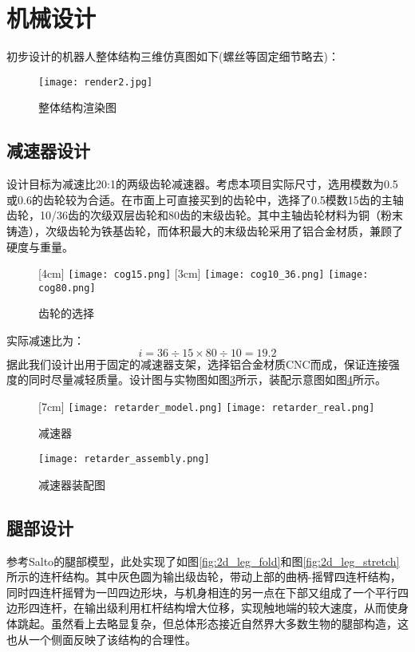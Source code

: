 \section{机械设计}
\label{sec:mechanical}
初步设计的机器人整体结构三维仿真图如下(螺丝等固定细节略去)：
\begin{figure}[H]
  \centering
  \texttt{[image: render2.jpg]}
  \caption{整体结构渲染图}
  \label{fig:render_v1}
\end{figure}
\subsection{减速器设计}
设计目标为减速比20:1的两级齿轮减速器。考虑本项目实际尺寸，选用模数为0.5或0.6的齿轮较为合适。在市面上可直接买到的齿轮中，选择了0.5模数15齿的主轴齿轮，10/36齿的次级双层齿轮和80齿的末级齿轮。其中主轴齿轮材料为铜（粉末铸造），次级齿轮为铁基齿轮，而体积最大的末级齿轮采用了铝合金材质，兼顾了硬度与重量。

\begin{figure}[H]
  \centering
  [4cm] 
    {\texttt{[image: cog15.png]}}
  \hspace{3em}
  [3cm]
      {\texttt{[image: cog10\_36.png]}}
  \hspace{4em}
      {\texttt{[image: cog80.png]}}
  \caption{齿轮的选择}
  \label{fig:cogs}

\end{figure}
实际减速比为：$$i=36\div15\times80\div10=19.2$$
据此我们设计出用于固定的减速器支架，选择铝合金材质CNC而成，保证连接强度的同时尽量减轻质量。设计图与实物图如图\ref{fig:retarder}所示，装配示意图如图\ref{fig:retarder_assembly}所示。
\begin{figure}[H]
  \centering
  [7cm] 
    {\texttt{[image: retarder\_model.png]}}
  \hspace{4em}
      {\texttt{[image: retarder\_real.png]}}
  \caption{减速器}
  \label{fig:retarder}
\end{figure}
\begin{figure}[H]
  \centering%
  \texttt{[image: retarder\_assembly.png]}
  \caption{减速器装配图}
  \label{fig:retarder_assembly}
\end{figure}
\subsection{腿部设计}
参考Salto\cite{Salto}的腿部模型，此处实现了如图\ref{fig:2d_leg_fold}和图\ref{fig:2d_leg_stretch}所示的连杆结构。其中灰色圆为输出级齿轮，带动上部的曲柄-摇臂四连杆结构，同时四连杆摇臂为一凹四边形块，与机身相连的另一点在下部又组成了一个平行四边形四连杆，在输出级利用杠杆结构增大位移，实现触地端的较大速度，从而使身体跳起。虽然看上去略显复杂，但总体形态接近自然界大多数生物的腿部构造，这也从一个侧面反映了该结构的合理性。

